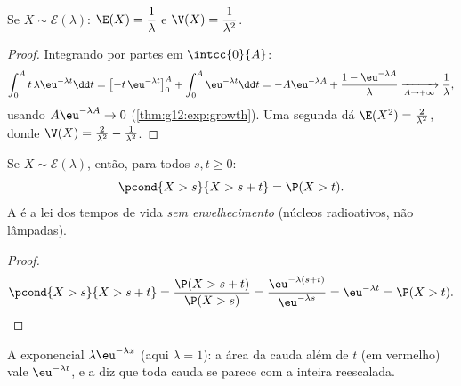 \begin{proposition}\label{prop:g12:contdist:expomoments}
Se $X \sim \mathcal E(\lambda)$:
$\E(X) = \dfrac{1}{\lambda}$ e $\V(X) = \dfrac{1}{\lambda^2}$.
\end{proposition}

\begin{proof}
Integrando por partes em $\intcc{0}{A}$:
\[
\int_0^A t\,\lambda\eu^{-\lambda t}\dd t
= \bigl[-t\,\eu^{-\lambda t}\bigr]_0^A + \int_0^A \eu^{-\lambda t}\dd t
= -A\eu^{-\lambda A} + \frac{1 - \eu^{-\lambda A}}{\lambda}
\xrightarrow[A\to+\infty]{} \frac1\lambda,
\]
usando $A\eu^{-\lambda A} \to 0$ (\cref{thm:g12:exp:growth}). Uma segunda
 dá $\E(X^2) = \frac{2}{\lambda^2}$, donde
$\V(X) = \frac{2}{\lambda^2} - \frac{1}{\lambda^2}$.
\end{proof}

\begin{theorem}\label{thm:g12:contdist:memoryless}
Se $X \sim \mathcal E(\lambda)$, então, para todos $s, t \geq 0$:
\[
\pcond{X > s}{X > s + t} = \P(X > t) .
\]
A  é a lei dos tempos de vida \emph{sem
envelhecimento} (núcleos radioativos, não lâmpadas).
\end{theorem}

\begin{proof}
\[
\pcond{X > s}{X > s+t}
= \frac{\P(X > s + t)}{\P(X > s)}
= \frac{\eu^{-\lambda(s+t)}}{\eu^{-\lambda s}} = \eu^{-\lambda t}
= \P(X > t). \qedhere
\]
\end{proof}

\begin{omfigure}

{\small A  exponencial $\lambda\eu^{-\lambda x}$ (aqui
$\lambda = 1$): a área da cauda além de $t$ (em vermelho) vale
$\eu^{-\lambda t}$, e a  diz que toda cauda se parece
com a  inteira reescalada.}
\end{omfigure}


